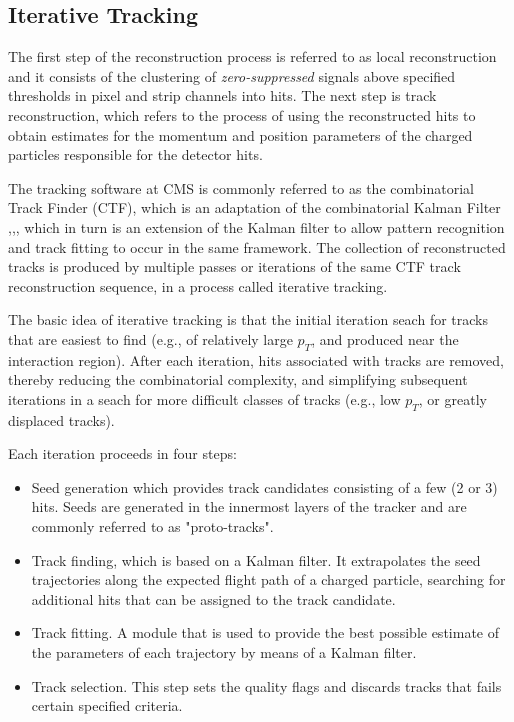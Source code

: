 \subsection{Iterative Tracking}

 The first step of the reconstruction process is referred to as local reconstruction and it consists of the clustering of \textit{zero-suppressed} signals above specified thresholds in pixel and strip channels into hits. The next step is track reconstruction, which refers to the process of using the reconstructed hits to obtain estimates for the momentum and position parameters of the charged particles responsible for the detector hits. 

 The tracking software at CMS\cite{TRK-11-001} is commonly referred to as the combinatorial Track Finder (CTF), which is an adaptation of the combinatorial Kalman Filter \cite{Billoir:1989mh},\cite{BILLOIR1990219},\cite{Mankel:1997dy}, which in turn is an extension of the Kalman filter\cite{Fruhwirth:1987fm} to allow pattern recognition and track fitting to occur in the same framework. The collection of reconstructed tracks is produced by multiple passes or iterations of the same CTF track reconstruction sequence, in a process called iterative tracking. 

The basic idea of iterative tracking is that the initial iteration seach for tracks that are easiest to find (e.g., of relatively large $p_{T}$, and produced near the interaction region). After each iteration, hits associated with tracks are removed, thereby reducing the combinatorial complexity, and simplifying subsequent iterations in a seach for more difficult classes of tracks (e.g., low $p_{T}$, or greatly displaced tracks).

Each iteration proceeds in four steps:

\begin{itemize}
	\item Seed generation which provides track candidates consisting of a few (2 or 3) hits. Seeds are generated in the innermost layers of the tracker and are commonly referred to as "proto-tracks".
	\item Track finding, which is based on a Kalman filter. It extrapolates the seed trajectories along the expected flight path of a charged particle, searching for additional hits that can be assigned to the track candidate.
	\item Track fitting. A module that is used to provide the best possible estimate of the parameters of each trajectory by means of a Kalman filter.
	\item Track selection. This step sets the quality flags and discards tracks that fails certain specified criteria.
\end{itemize}

